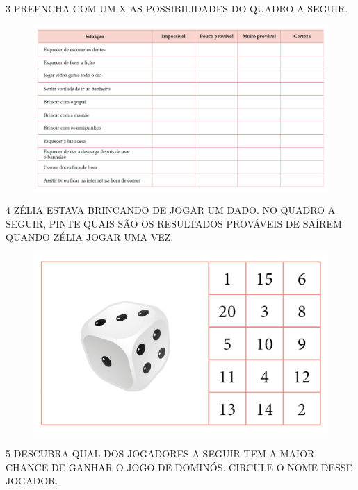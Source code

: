 \pagebreak
\num{3} PREENCHA COM UM X AS POSSIBILIDADES DO QUADRO A SEGUIR.

\begin{figure}[H]
\includegraphics[width=\textwidth]{./media/SAEB_1ANO_MAT_FIGURA87.png}
\end{figure}


\num{4} ZÉLIA ESTAVA BRINCANDO DE JOGAR UM DADO. NO QUADRO A SEGUIR, PINTE QUAIS SÃO
OS RESULTADOS PROVÁVEIS DE SAÍREM QUANDO ZÉLIA JOGAR UMA VEZ.

\begin{figure}[H]
\centering
\includegraphics[width=.8\textwidth]{./media/SAEB_1ANO_MAT_FIGURA88.png}
\end{figure}


\pagebreak
\num{5} DESCUBRA QUAL DOS JOGADORES A SEGUIR TEM A MAIOR CHANCE DE GANHAR O JOGO
DE DOMINÓS. CIRCULE O NOME DESSE JOGADOR.

